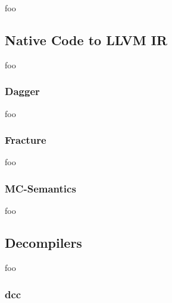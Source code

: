 \documentclass[12pt, a4paper]{article}
\begin{document}
foo


\subsection{Native Code to LLVM IR}


foo


\subsubsection{Dagger}

foo


\subsubsection{Fracture}

foo


\subsubsection{MC-Semantics}


foo


\subsection{Decompilers}

foo


\subsubsection{dcc}
\end{document}
